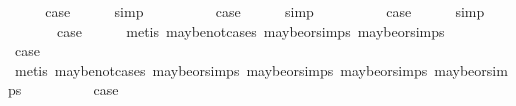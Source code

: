 \begin{isabellebody}
\ \ \isamarkupfalse%
\ \isamarkupfalse%
\ {\isacharquery}case\isanewline
\ \ \ \ \isamarkupfalse%
\ simp\isanewline
{}\isamarkupfalse%
\isanewline
\ \ \isamarkupfalse%
\ {\isachardoublequoteopen}{}{\isacharunderscore}{}{\isachardoublequoteclose}\isanewline
\ \ \isamarkupfalse%
\ \isamarkupfalse%
\ {\isacharquery}case\isanewline
\ \ \ \ \isamarkupfalse%
\ simp\isanewline
{}\isamarkupfalse%
\isanewline
\ \ \isamarkupfalse%
\ {\isachardoublequoteopen}{}{\isacharunderscore}{}{\isachardoublequoteclose}\isanewline
\ \ \isamarkupfalse%
\ \isamarkupfalse%
\ {\isacharquery}case\isanewline
\ \ \ \ \isamarkupfalse%
\ simp\isanewline
{}\isamarkupfalse%
\isanewline
\ \ \isamarkupfalse%
\ {\isachardoublequoteopen}{}{\isacharunderscore}{}{\isachardoublequoteclose}\isanewline
\ \ \isamarkupfalse%
\ \isamarkupfalse%
\ {\isacharquery}case\isanewline
\ \ \ \ \isamarkupfalse%
\ {\isacharparenleft}metis\ maybe{\isacharunderscore}not{\isachardot}cases\ maybe{\isacharunderscore}or{\isachardot}simps{\isacharparenleft}{}{\isacharparenright}\ maybe{\isacharunderscore}or{\isachardot}simps{\isacharparenleft}{}{\isacharparenright}{\isacharparenright}\isanewline
{}\isamarkupfalse%
\isanewline
\ \ \isamarkupfalse%
\ {\isachardoublequoteopen}{}{\isacharunderscore}{}{\isachardoublequoteclose}\isanewline
\ \ \isamarkupfalse%
\ \isamarkupfalse%
\ {\isacharquery}case\isanewline
\ \ \ \ \isamarkupfalse%
\ {\isacharparenleft}metis\ maybe{\isacharunderscore}not{\isachardot}cases\ maybe{\isacharunderscore}or{\isachardot}simps{\isacharparenleft}{}{\isacharparenright}\ maybe{\isacharunderscore}or{\isachardot}simps{\isacharparenleft}{}{\isacharparenright}\ maybe{\isacharunderscore}or{\isachardot}simps{\isacharparenleft}{}{\isacharparenright}\ maybe{\isacharunderscore}or{\isachardot}simps{\isacharparenleft}{}{\isacharparenright}{\isacharparenright}\isanewline
{}\isamarkupfalse%
\isanewline
\ \ \isamarkupfalse%
\ {}\isanewline
\ \ \isamarkupfalse%
\ \isamarkupfalse%
\ {\isacharquery}case\isanewline

\end{isabellebody}
